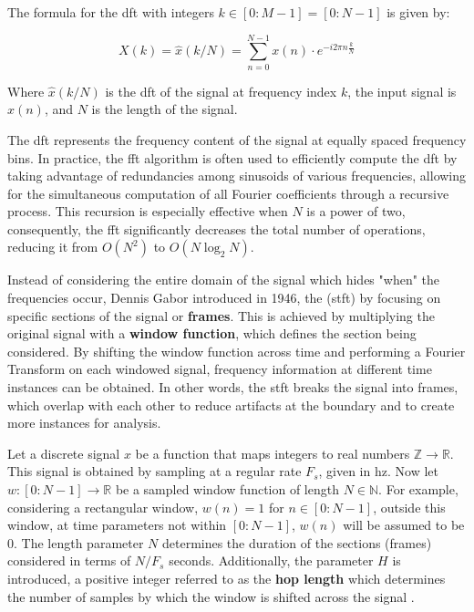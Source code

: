 The formula for the \gls{dft} with integers $k \in[0:M-1]=[0:N-1]$ is given by:

\begin{equation}
    \label{eq:frmwk_audio_fund_dft}
    X(k) = \hat{x}(k / N)=\sum_{n=0}^{N-1} x(n) \cdot e^{-i 2 \pi n \frac{k}{N} }
\end{equation}

Where $\hat{x}(k/N)$ is the \gls{dft} of the signal at frequency index $k$, the input signal is $x(n)$, and $N$ is the length of the signal.

The \gls{dft} represents the frequency content of the signal at equally spaced frequency bins. In practice, the \gls{fft} algorithm is often used to efficiently compute the \gls{dft} by taking advantage of redundancies among sinusoids of various frequencies, allowing for the simultaneous computation of all Fourier coefficients through a recursive process. This recursion is especially effective when $N$ is a power of two, consequently, the \gls{fft} significantly decreases the total number of operations, reducing it from $O(N^2)$ to $O(N \log_2 N)$.

Instead of considering the entire domain of the signal which hides "when" the frequencies occur, Dennis Gabor introduced in 1946, the  (\gls{stft}) by focusing on specific sections of the signal or \textbf{frames}. This is achieved by multiplying the original signal with a \textbf{window function}, which defines the section being considered. By shifting the window function across time and performing a Fourier Transform on each windowed signal, frequency information at different time instances can be obtained. In other words, the \gls{stft} breaks the signal into frames, which overlap with each other to reduce artifacts at the boundary and to create more instances for analysis. 

Let a discrete signal $x$ be a function that maps integers to real numbers $\mathbb{Z} \rightarrow \mathbb{R}$. This signal is obtained by sampling at a regular rate $F_s$, given in \gls{hz}. Now let $w : [0:N - 1] \rightarrow \mathbb{R}$ be a sampled window function of length $N \in \mathbb{N}$. For example, considering a rectangular window, $w(n) = 1$ for $n \in [0:N - 1]$, outside this window, at time parameters not within $[0:N - 1]$, $w(n)$ will be assumed to be 0. The length parameter $N$ determines the duration of the sections (frames) considered in terms of $N/F_s$ seconds. Additionally, the parameter $H$ is introduced, a positive integer referred to as the \textbf{hop length} which determines the number of samples by which the window is shifted across the signal \cite{Mueller2021}.


